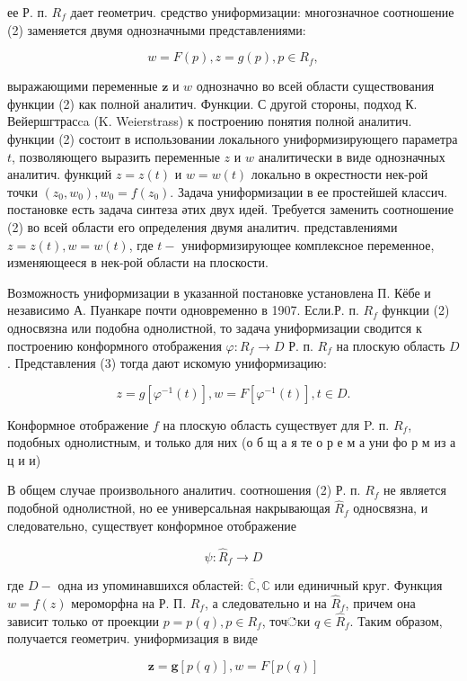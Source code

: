 \documentclass[10pt]{article}
\begin{document}
ее Р. п. $R_{f}$ дает геометрич. средство униформизации: многозначное соотношение (2) заменяется двумя однозначными представлениями:



\[

w=F(p), z=g(p), p \in R_{f},

\]



выражающими переменные $\boldsymbol{z}$ и $w$ однозначно во всей области существования функции (2) как полной аналитич. Функции. С другой стороны, подход К. Вейершгтрасca (K. Weierstrass) к построению понятия полной аналитич. функции (2) состоит в использовании локального униформизирующего параметра $t$, позволяющего выразить переменные $z$ и $w$ аналитически в виде однозначных аналитич. функций $z=z(t)$ и $w=w(t)$ локально в окрестности нек-рой точки $\left(z_{0}, w_{0}\right), w_{0}=f\left(z_{0}\right)$. Задача униформизации в ее простейшей классич. постановке есть задача синтеза әтих двух идей. Требуется заменить соотношение (2) во всей области его определения двумя аналитич. представлениями $z=z(t), w=w(t)$, где $t-$ униформизирующее комплексное переменное, изменяющееся в нек-рой области на плоскости.



Возможность униформизации в указанной постановке установлена П. Кёбе и независимо А. Пуанкаре почти одновременно в 1907. Если.Р. п. $R_{f}$ функции (2) односвязна или подобна однолистной, то задача униформизации сводится к построению конформного отображения $\varphi: R_{f} \rightarrow D$ Р. п. $R_{f}$ на плоскую область $D$. Представления (3) тогда дают искомую униформизацию:



\[

z=g\left[\varphi^{-1}(t)\right], w=F\left[\varphi^{-1}(t)\right], t \in D .

\]



Конформное отображение $f$ на плоскую область существует для P. п. $R_{f}$, подобных однолистным, и только для них (о б щ а я те о р е м а уни фо р м из а ц и и)



В общем случае произвольного аналитич. соотношения (2) Р. п. $R_{f}$ не является подобной однолистной, но ее универсальная накрывающая $\hat{R}_{f}$ односвязна, и следовательно, существует конформное отображение



\[

\psi: \hat{R}_{f} \longrightarrow D

\]



где $D-$ одна из упоминавшихся областей: $\overline{\mathbb{C}}, \mathbb{C}$ или единичный круг. Функция $w=f(z)$ мероморфна на Р. П. $R_{f}$, а следовательно и на $\hat{R}_{f}$, причем она зависит только от проекции $p=p(q), p \in R_{f}$, точ்ки $q \in \hat{R}_{f}$. Таким образом, получается геометрич. униформизация в виде



\[

\boldsymbol{z}=\boldsymbol{g}[p(q)], w=F[p(q)]

\]
\end{document}

